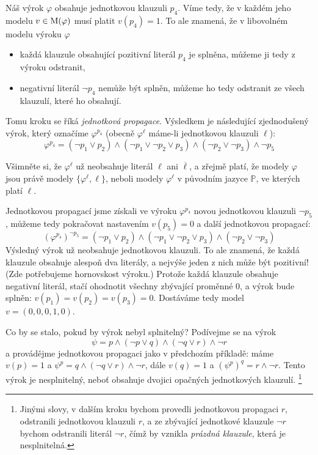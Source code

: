 Náš výrok $\varphi$ obsahuje jednotkovou klauzuli $p_4$. Víme tedy, že v každém jeho modelu $v\in\operatorname{M}(\varphi)$ musí platit $v(p_4)=1$. To ale znamená, že v libovolném modelu výroku $\varphi$
\begin{itemize}
    \item každá klauzule obsahující pozitivní literál $p_4$ je splněna, můžeme ji tedy z výroku odstranit,
    \item negativní literál $\neg p_4$ nemůže být splněn, můžeme ho tedy odstranit ze všech klauzulí, které ho obsahují. 
\end{itemize}
Tomu kroku se říká \emph{jednotková propagace}. Výsledkem je následující zjednodušený výrok, který označíme $\varphi^{p_4}$ (obecně $\varphi^\ell$ máme-li jednotkovou klauzuli $\ell$):
$$
\varphi^{p_4}=(\neg p_1\lor p_2)\land(\neg p_1\lor\neg p_2\lor p_3)\land (\neg p_2\lor\neg p_3)\land\neg p_5
$$
\begin{observation}
Všimněte si, že $\varphi^\ell$ už neobsahuje literál $\ell$ ani $\overline{\ell}$, a zřejmě platí, že modely $\varphi$ jsou právě modely $\{\varphi^{\ell},\ell\}$, neboli modely $\varphi^{\ell}$ v původním jazyce $\mathbb P$, ve kterých platí $\ell$.
\end{observation}

Jednotkovou propagací jsme získali ve výroku $\varphi^{p_4}$ novou jednotkovou klauzuli $\neg p_5$, můžeme tedy pokračovat nastavením $v(p_5)=0$ a další jednotkovou propagací:
$$
(\varphi^{p_4})^{\neg p_5}=(\neg p_1\lor p_2)\land(\neg p_1\lor\neg p_2\lor p_3)\land(\neg p_2\lor\neg p_3)
$$
Výsledný výrok už neobsahuje jednotkovou klauzuli. To ale znamená, že každá klauzule obsahuje alespoň dva literály, a nejvýše jeden z nich může být pozitivní! (Zde potřebujeme hornovskost výroku.) Protože každá klauzule obsahuje negativní literál, stačí ohodnotit všechny zbývající proměnné 0, a výrok bude splněn: $v(p_1)=v(p_2)=v(p_3)=0$. Dostáváme tedy model $v=(0,0,0,1,0)$.

\begin{example}
    Co by se stalo, pokud by výrok nebyl splnitelný? Podívejme se na výrok 
    $$
    \psi=p\land (\neg p\lor q)\land (\neg q\lor r)\land\neg r
    $$ 
    a provádějme jednotkovou propagaci jako v předchozím příkladě: máme $v(p)=1$ a 
$\psi^p=q\land (\neg q\lor r)\land\neg r$, dále $v(q)=1$ a $(\psi^p)^q=r\land\neg r$. 
Tento výrok je nesplnitelný, neboť obsahuje dvojici opačných jednotkových klauzulí. \footnote{Jinými slovy, v dalším kroku bychom provedli jednotkovou propagaci $r$, odstranili jednotkovou klauzuli $r$, a ze zbývající jednotkové klauzule $\neg r$ bychom odstranili literál $\neg r$, čímž by vznikla \emph{prázdná klauzule}, která je nesplnitelná.}
\end{example}

